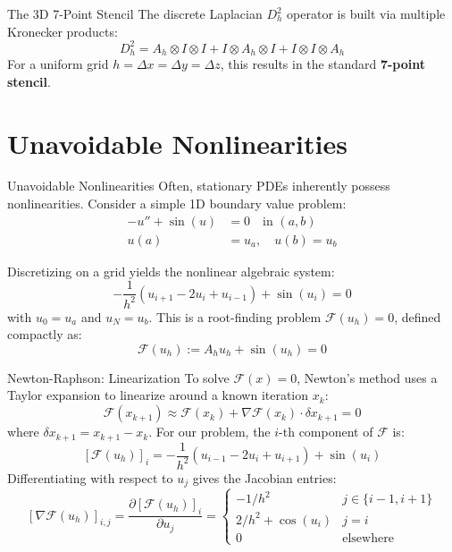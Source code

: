 \documentclass[aspectratio=169]{beamer}
\begin{document}
\begin{frame}{The 3D 7-Point Stencil}
    The discrete Laplacian $D_h^2$ operator is built via multiple Kronecker products:
    \[
        D_h^2 = A_h \otimes I \otimes I + I \otimes A_h \otimes I + I \otimes I \otimes A_h
    \]
    For a uniform grid $h = \Delta x = \Delta y = \Delta z$, this results in the standard \textbf{7-point stencil}.

\end{frame}

\section{Unavoidable Nonlinearities}

\begin{frame}{Unavoidable Nonlinearities}
    Often, stationary PDEs inherently possess nonlinearities. Consider a simple 1D boundary value problem:
    \begin{align*}
        -u'' + \sin(u) &= 0 \quad \text{in } (a, b) \\
        u(a) &= u_a, \quad u(b) = u_b
    \end{align*}
    
    Discretizing on a grid yields the nonlinear algebraic system:
    \[
        -\frac{1}{h^2}(u_{i+1} - 2u_i + u_{i-1}) + \sin(u_i) = 0
    \]
    with $u_0 = u_a$ and $u_N=u_b$. This is a root-finding problem $\mathcal{F}(u_h) = 0$, defined compactly as:
    \[
        \mathcal{F}(u_h) := A_h u_h + \sin(u_h) = 0
    \]
\end{frame}

\begin{frame}{Newton-Raphson: Linearization}
    To solve $\mathcal{F}(x) = 0$, Newton's method uses a Taylor expansion to linearize around a known iteration $x_k$:
    \[
        \mathcal{F}(x_{k+1}) \approx \mathcal{F}(x_k) + \nabla \mathcal{F}(x_k) \cdot \delta x_{k+1} = 0
    \]
    where $\delta x_{k+1} = x_{k+1} - x_k$. For our problem, the $i$-th component of $\mathcal{F}$ is:
    \[
        [\mathcal{F}(u_h)]_i = -\frac{1}{h^2}(u_{i-1} - 2u_i + u_{i+1}) + \sin(u_i)
    \]
    Differentiating with respect to $u_j$ gives the Jacobian entries:
    \[
        [\nabla \mathcal{F}(u_h)]_{i,j} = \frac{\partial [\mathcal{F}(u_h)]_i}{\partial u_j} = 
        \begin{cases}
            -1/h^2 & j \in \{i-1, i+1\} \\
            2/h^2 + \cos(u_i) & j = i \\
            0 & \text{elsewhere}
        \end{cases}
    \]
\end{frame}
\end{document}
